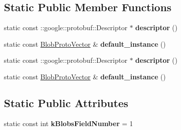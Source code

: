 \subsection*{Static Public Member Functions}
\begin{DoxyCompactItemize}
\item 
\mbox{\label{classcaffe_1_1_blob_proto_vector_a96d09f2916c18bb480f4a07b7f46ec2a}} 
static const \+::google\+::protobuf\+::\+Descriptor $\ast$ {\bfseries descriptor} ()
\item 
\mbox{\label{classcaffe_1_1_blob_proto_vector_a7eaebc1707d830b711212d9a65cd34af}} 
static const \mbox{\hyperlink{classcaffe_1_1_blob_proto_vector}{Blob\+Proto\+Vector}} \& {\bfseries default\+\_\+instance} ()
\item 
\mbox{\label{classcaffe_1_1_blob_proto_vector_aaafd50b67b3664821bb20f47f0d6f696}} 
static const \+::google\+::protobuf\+::\+Descriptor $\ast$ {\bfseries descriptor} ()
\item 
\mbox{\label{classcaffe_1_1_blob_proto_vector_ae4d17b3a9e4f11c6f4efd2829d3b3535}} 
static const \mbox{\hyperlink{classcaffe_1_1_blob_proto_vector}{Blob\+Proto\+Vector}} \& {\bfseries default\+\_\+instance} ()
\end{DoxyCompactItemize}
\subsection*{Static Public Attributes}
\begin{DoxyCompactItemize}
\item 
\mbox{\label{classcaffe_1_1_blob_proto_vector_a337a33ee7d60fc98b858d7374f5a148e}} 
static const int {\bfseries k\+Blobs\+Field\+Number} = 1
\end{DoxyCompactItemize}
